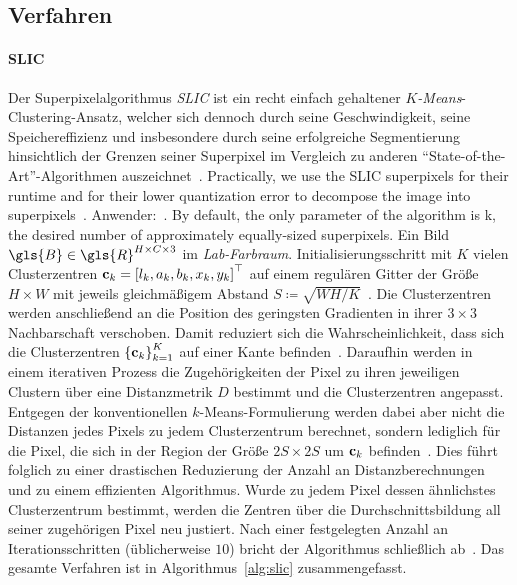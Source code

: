 \subsection{Verfahren}
\label{superpixel_verfahren}


\paragraph{SLIC}
\label{slic}

Der Superpixelalgorithmus \emph{\gls{SLIC}} ist ein recht einfach gehaltener \emph{$K$-Means}-Clustering-Ansatz, welcher sich dennoch durch seine Geschwindigkeit, seine Speichereffizienz und insbesondere durch seine erfolgreiche Segmentierung hinsichtlich der Grenzen seiner Superpixel im Vergleich zu anderen \enquote{State-of-the-Art}-Algorithmen auszeichnet~\cite{slic}.
Practically, we use the SLIC superpixels for their runtime and for their lower quantization error to decompose the image into superpixels~\cite{Gadde}.
Anwender:~\cite{Gadde, supercnn}.
By default, the only parameter of the algorithm is k, the desired number of approximately equally-sized superpixels.
Ein Bild $\gls{B} \in \gls{R}^{H \times C \times 3}$ im \emph{Lab-Farbraum}.
Initialisierungsschritt mit $K$ vielen Clusterzentren $\ve{c}_k = {\left[l_k, a_k, b_k, x_k, y_k\right]}^{\top}$ auf einem regulären Gitter der Größe $H \times W$ mit jeweils gleichmäßigem Abstand $S \coloneqq \sqrt{WH/K}$~\cite{slic}.
Die Clusterzentren werden anschließend an die Position des geringsten Gradienten in ihrer $3 \times 3$ Nachbarschaft verschoben.
Damit reduziert sich die Wahrscheinlichkeit, dass sich die Clusterzentren ${\left\{\ve{c}_k\right\}}_{k=1}^K$ auf einer Kante befinden~\cite{slic}.
Daraufhin werden in einem iterativen Prozess die Zugehörigkeiten der Pixel zu ihren jeweiligen Clustern über eine Distanzmetrik $D$ bestimmt und die Clusterzentren angepasst.
Entgegen der konventionellen $k$-Means-Formulierung werden dabei aber nicht die Distanzen jedes Pixels zu jedem Clusterzentrum berechnet, sondern lediglich für die Pixel, die sich in der Region der Größe $2S \times 2S$ um $\mathbf{c}_k$ befinden~\cite{slic}.
Dies führt folglich zu einer drastischen Reduzierung der Anzahl an Distanzberechnungen und zu einem effizienten Algorithmus.
Wurde zu jedem Pixel dessen ähnlichstes Clusterzentrum bestimmt, werden die Zentren über die Durchschnittsbildung all seiner zugehörigen Pixel neu justiert.
Nach einer festgelegten Anzahl an Iterationsschritten (üblicherweise $10$) bricht der Algorithmus schließlich ab~\cite{slic}.
Das gesamte Verfahren ist in Algorithmus~\ref{alg:slic} zusammengefasst.

